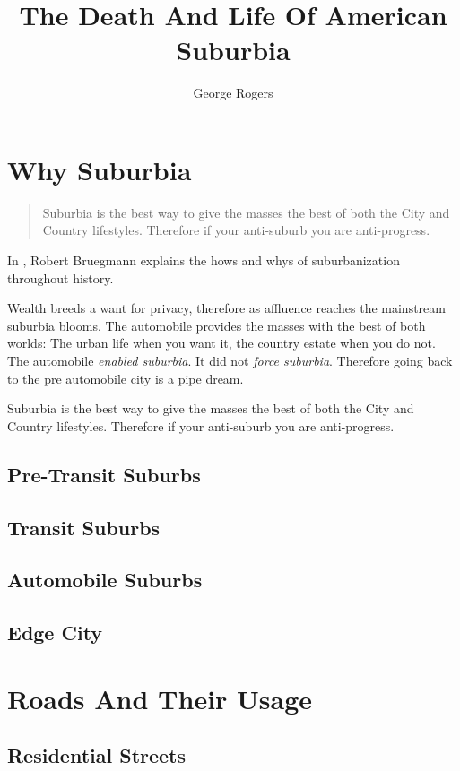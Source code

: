 \documentclass[8pt]{amsbook}
\title{The Death And Life Of American Suburbia}
\author{George Rogers}
\begin{document}
\setcounter{chapter}{-1}
\dominitoc
\maketitle

\tableofcontents

\chapter{Why Suburbia}
\begin{quotation}
    Suburbia is the best way to give the masses the best of both the City and Country lifestyles.
    Therefore if your anti-suburb you are anti-progress.
\end{quotation}
\minitoc

In \cite{rBruegmann05}, Robert Bruegmann explains the hows and whys of suburbanization throughout history.

Wealth breeds a want for privacy,
therefore as affluence reaches the mainstream suburbia blooms.
The automobile provides the masses with the best of both worlds:
The urban life when you want it, the country estate when you do not.
The automobile \emph{enabled suburbia}. It did not \emph{force suburbia}.
Therefore going back to the pre automobile city is a pipe dream.

Suburbia is the best way to give the masses the best of both the City and Country lifestyles.
Therefore if your anti-suburb you are anti-progress.
\section{Pre-Transit Suburbs}
\section{Transit Suburbs}
\section{Automobile Suburbs}
\section{Edge City}
\chapter{Roads And Their Usage}
\minitoc
\section{Residential Streets}
\end{document}
